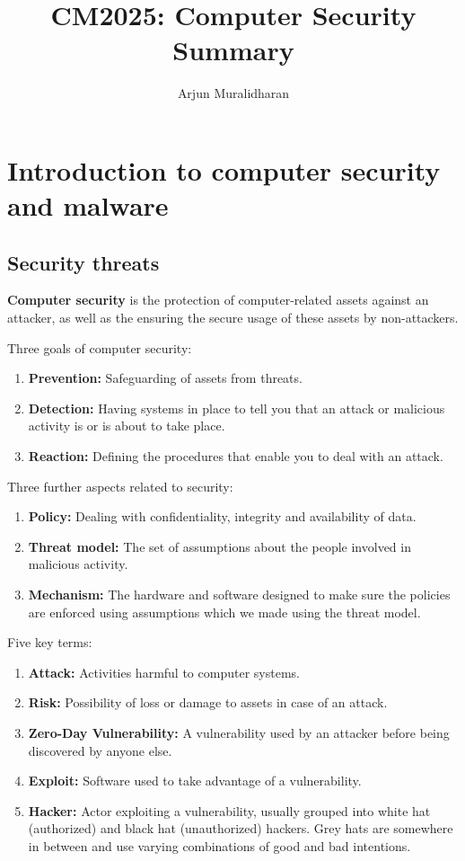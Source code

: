 \title{CM2025: Computer Security \\ Summary}
\author{Arjun Muralidharan}



\section{Introduction to computer security and malware}

\subsection{Security threats}

\textbf{Computer security} is the protection of computer-related assets against an attacker, as well as the ensuring the secure usage of these assets by non-attackers.

Three goals of computer security:

\begin{enumerate}
    \item \textbf{Prevention:} Safeguarding of assets from threats.
    \item \textbf{Detection:} Having systems in place to tell you that an attack or malicious activity is or is about to take place.
    \item \textbf{Reaction:} Defining the procedures that enable you to deal with an attack.
\end{enumerate}

Three further aspects related to security:

\begin{enumerate}
    \item \textbf{Policy:} Dealing with confidentiality, integrity and availability of data.
    \item \textbf{Threat model:} The set of assumptions about the people involved in malicious activity.
    \item \textbf{Mechanism:} The hardware and software designed to make sure the policies are enforced using assumptions which we made using the threat model.
\end{enumerate}

Five key terms:

\begin{enumerate}
    \item \textbf{Attack:} Activities harmful to computer systems.
    \item \textbf{Risk:} Possibility of loss or damage to assets in case of an attack.
    \item \textbf{Zero-Day Vulnerability:} A vulnerability used by an attacker before being discovered by anyone else. 
    \item \textbf{Exploit:} Software used to take advantage of a vulnerability.
    \item \textbf{Hacker:} Actor exploiting a vulnerability, usually grouped into white hat (authorized) and black hat (unauthorized) hackers. Grey hats are somewhere in between and use varying combinations of good and bad intentions.
\end{enumerate}

